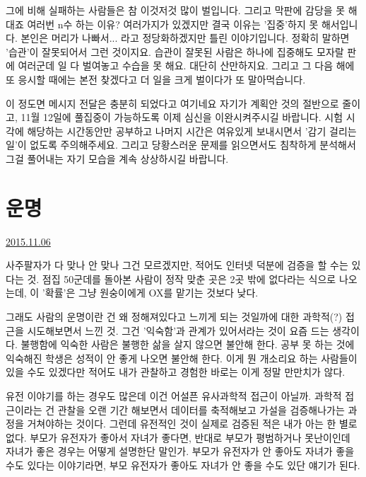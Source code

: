 그에 비해 실패하는 사람들은 참 이것저것 많이 벌입니다. 그리고 막판에 감당을 못 해대죠
여러번 n수 하는 이유? 여러가지가 있겠지만 결국 이유는 '집중'하지 못 해서입니다.
본인은 머리가 나빠서... 라고 정당화하겠지만 틀린 이야기입니다. 정확히 말하면 '습관'이 잘못되어서 그런 것이지요.
습관이 잘못된 사람은 하나에 집중해도 모자랄 판에 여러군데 일 다 벌여놓고 수습을 못 해요. 대단히 산만하지요.
그리고 그 다음 해에 또 응시할 때에는 본전 찾겠다고 더 일을 크게 벌이다가 또 말아먹습니다.
\vspace{5mm}

이 정도면 메시지 전달은 충분히 되었다고 여기네요
자기가 계획안 것의 절반으로 줄이고, 11월 12일에 풀집중이 가능하도록 이제 심신을 이완시켜주시길 바랍니다.
시험 시각에 해당하는 시간동안만 공부하고 나머지 시간은 여유있게 보내시면서 '감기 걸리는 일'이 없도록 주의해주세요.
그리고 당황스러운 문제를 읽으면서도 침착하게 분석해서 그걸 풀어내는 자기 모습을 계속 상상하시길 바랍니다.
\vspace{5mm}








\section{운명}
\href{https://www.kockoc.com/Apoc/465783}{2015.11.06}

\vspace{5mm}

사주팔자가 다 맞나 안 맞나 그건 모르겠지만, 적어도 인터넷 덕분에 검증을 할 수는 있다는 것.
점집 50군데를 돌아본 사람이 정작 맞춘 곳은 2곳 밖에 없다라는 식으로 나오는데, 이 '확률'은 그냥 원숭이에게 OX를 맡기는 것보다 낮다.
\vspace{5mm}

그래도 사람의 운명이란 건 왜 정해져있다고 느끼게 되는 것일까에 대한 과학적(?) 접근을 시도해보면서 느낀 것.
그건 '익숙함'과 관계가 있어서라는 것이 요즘 드는 생각이다.
불행함에 익숙한 사람은 불행한 삶을 살지 않으면 불안해 한다.
공부 못 하는 것에 익숙해진 학생은 성적이 안 좋게 나오면 불안해 한다.
이게 뭔 개소리요 하는 사람들이 있을 수도 있겠다만 적어도 내가 관찰하고 경험한 바로는 이게 정말 만만치가 않다.
\vspace{5mm}

유전 이야기를 하는 경우도 많은데 이건 어설픈 유사과학적 접근이 아닐까.
과학적 접근이라는 건 관찰을 오랜 기간 해보면서 데이터를 축적해보고 가설을 검증해나가는 과정을 거쳐야하는 것이다.
그런데 유전적인 것이 실제로 검증된 적은 내가 아는 한 별로 없다. 부모가 유전자가 좋아서 자녀가 좋다면,
반대로 부모가 평범하거나 못난이인데 자녀가 좋은 경우는 어떻게 설명한단 말인가.
부모가 유전자가 안 좋아도 자녀가 좋을 수도 있다는 이야기라면, 부모 유전자가 좋아도 자녀가 안 좋을 수도 있단 얘기가 된다.
\vspace{5mm}

